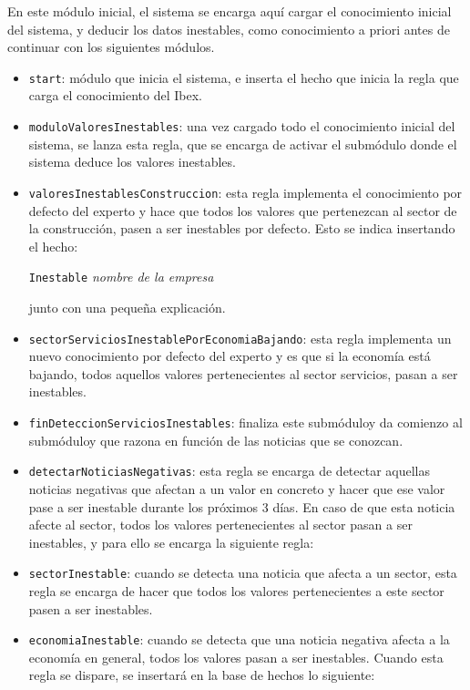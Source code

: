\documentclass[10pt,spanish]{article}
\theoremstyle{plain}
\theoremstyle{definition}
\begin{document}
En este módulo inicial, el sistema se encarga aquí cargar el conocimiento inicial del sistema, y deducir los datos inestables, como conocimiento a priori antes de continuar con los siguientes módulos.

\begin{itemize}
    \item \texttt{start}: módulo que inicia el sistema, e inserta el hecho que inicia la regla que carga el conocimiento del Ibex.
    \item \texttt{moduloValoresInestables}: una vez cargado todo el conocimiento inicial del sistema, se lanza esta regla, que se encarga de activar el submódulo donde el sistema deduce los valores inestables.
    \item \texttt{valoresInestablesConstruccion}: esta regla implementa el conocimiento por defecto del experto y hace que todos los valores que pertenezcan al sector de la construcción, pasen a ser inestables por defecto. Esto se indica insertando el hecho:
    \begin{center}
        \texttt{Inestable} \textit{nombre de la empresa}
    \end{center}
    junto con una pequeña explicación.
    \item \texttt{sectorServiciosInestablePorEconomiaBajando}: esta regla implementa un nuevo conocimiento por defecto del experto y es que si la economía está bajando, todos aquellos valores pertenecientes al sector servicios, pasan a ser inestables.
    \item \texttt{finDeteccionServiciosInestables}: finaliza este submóduloy da comienzo al submóduloy que razona en función de las noticias que se conozcan.
    \item \texttt{detectarNoticiasNegativas}: esta regla se encarga de detectar aquellas noticias negativas que afectan a un valor en concreto y hacer que ese valor pase a ser inestable durante los próximos 3 días. En caso de que esta noticia afecte al sector, todos los valores pertenecientes al sector pasan a ser inestables, y para ello se encarga la siguiente regla:
    \item \texttt{sectorInestable}: cuando se detecta una noticia que afecta a un sector, esta regla se encarga de hacer que todos los valores pertenecientes a este sector pasen a ser inestables.
    \item \texttt{economiaInestable}: cuando se detecta que una noticia negativa afecta a la economía en general, todos los valores pasan a ser inestables. Cuando esta regla se dispare, se insertará en la base de hechos lo siguiente:

\end{itemize}
\end{document}
